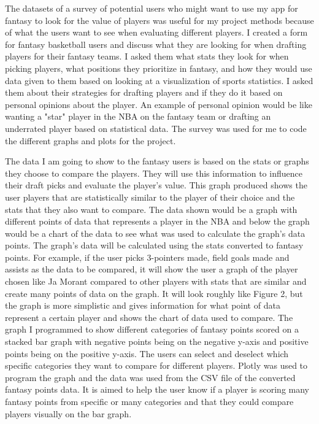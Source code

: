 \documentclass[10pt,twocolumn]{article}
\begin{document}
The datasets of a survey of potential users who might want to use my app for fantasy to look for the value of players was useful for my project methods because of what the users want to see when evaluating different players. I created a form for fantasy basketball users and discuss what they are looking for when drafting players for their fantasy teams. I asked them what stats they look for when picking players, what positions they prioritize in fantasy, and how they would use data given to them based on looking at a visualization of sports statistics. I asked them about their strategies for drafting players and if they do it based on personal opinions about the player. An example of personal opinion would be like wanting a "star" player in the NBA on the fantasy team or drafting an underrated player based on statistical data. The survey was used for me to code the different graphs and plots for the project.

The data I am going to show to the fantasy users is based on the stats or graphs they choose to compare the players. They will use this information to influence their draft picks and evaluate the player's value. This graph produced shows the user players that are statistically similar to the player of their choice and the stats that they also want to compare. The data shown would be a graph with different points of data that represents a player in the NBA and below the graph would be a chart of the data to see what was used to calculate the graph's data points. The graph's data will be calculated using the stats converted to fantasy points. For example, if the user picks 3-pointers made, field goals made and assists as the data to be compared, it will show the user a graph of the player chosen like Ja Morant compared to other players with stats that are similar and create many points of data on the graph. It will look roughly like Figure 2, but the graph is more simplistic and gives information for what point of data represent a certain player and shows the chart of data used to compare. The graph I programmed to show different categories of fantasy points scored on a stacked bar graph with negative points being on the negative y-axis and positive points being on the positive y-axis. The users can select and deselect which specific categories they want to compare for different players. Plotly was used to program the graph and the data was used from the CSV file of the converted fantasy points data. It is aimed to help the user know if a player is scoring many fantasy points from specific or many categories and that they could compare players visually on the bar graph.
\end{document}
